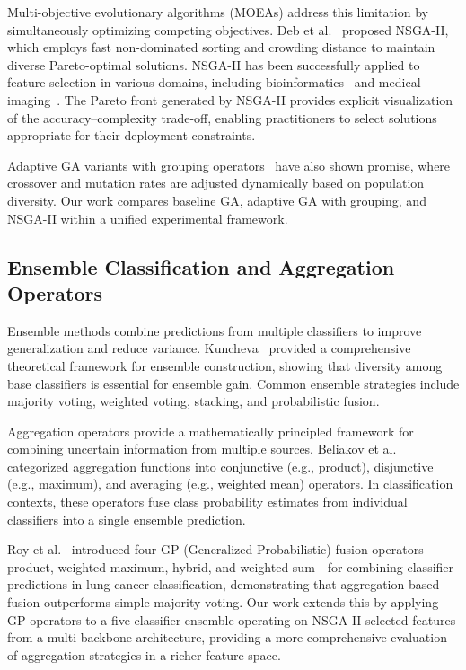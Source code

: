 \documentclass{article}
\begin{document}
Multi-objective evolutionary algorithms (MOEAs) address this limitation by simultaneously optimizing competing objectives. Deb et al.~\cite{deb2002fast} proposed NSGA-II, which employs fast non-dominated sorting and crowding distance to maintain diverse Pareto-optimal solutions. NSGA-II has been successfully applied to feature selection in various domains, including bioinformatics~\cite{xue2015survey} and medical imaging~\cite{chuang2011improved}. The Pareto front generated by NSGA-II provides explicit visualization of the accuracy--complexity trade-off, enabling practitioners to select solutions appropriate for their deployment constraints.

Adaptive GA variants with grouping operators~\cite{roy2025grouping} have also shown promise, where crossover and mutation rates are adjusted dynamically based on population diversity. Our work compares baseline GA, adaptive GA with grouping, and NSGA-II within a unified experimental framework.

\subsection{Ensemble Classification and Aggregation Operators}

Ensemble methods combine predictions from multiple classifiers to improve generalization and reduce variance. Kuncheva~\cite{kuncheva2014combining} provided a comprehensive theoretical framework for ensemble construction, showing that diversity among base classifiers is essential for ensemble gain. Common ensemble strategies include majority voting, weighted voting, stacking, and probabilistic fusion.

Aggregation operators provide a mathematically principled framework for combining uncertain information from multiple sources. Beliakov et al.~\cite{beliakov2007aggregation} categorized aggregation functions into conjunctive (e.g., product), disjunctive (e.g., maximum), and averaging (e.g., weighted mean) operators. In classification contexts, these operators fuse class probability estimates from individual classifiers into a single ensemble prediction.

Roy et al.~\cite{roy2025grouping} introduced four GP (Generalized Probabilistic) fusion operators---product, weighted maximum, hybrid, and weighted sum---for combining classifier predictions in lung cancer classification, demonstrating that aggregation-based fusion outperforms simple majority voting. Our work extends this by applying GP operators to a five-classifier ensemble operating on NSGA-II-selected features from a multi-backbone architecture, providing a more comprehensive evaluation of aggregation strategies in a richer feature space.
\end{document}
